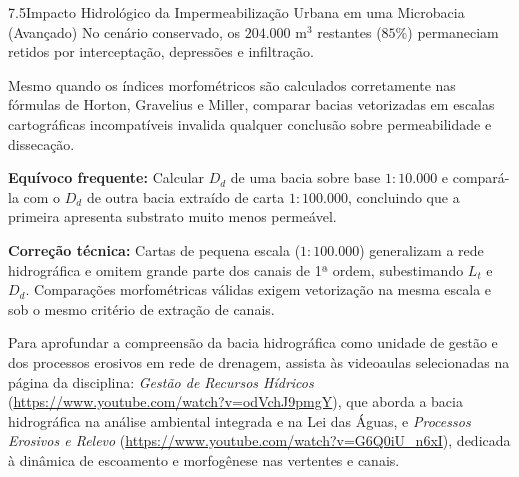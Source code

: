 \begin{boxExemplo}{7.5}{Impacto Hidrológico da Impermeabilização Urbana em uma Microbacia (Avançado)}
{  No cenário conservado, os $204.000\text{ m}^3$ restantes ($85\%$) permaneciam retidos por interceptação, depressões e infiltração.}
\end{boxExemplo}


Mesmo quando os índices morfométricos são calculados corretamente nas fórmulas de Horton, Gravelius e Miller, comparar bacias vetorizadas em escalas cartográficas incompatíveis invalida qualquer conclusão sobre permeabilidade e dissecação.

\begin{boxErro}
\textbf{Equívoco frequente:} Calcular $D_d$ de uma bacia sobre base $1{:}10.000$ e compará-la com o $D_d$ de outra bacia extraído de carta $1{:}100.000$, concluindo que a primeira apresenta substrato muito menos permeável.\par
\textbf{Correção técnica:} Cartas de pequena escala ($1{:}100.000$) generalizam a rede hidrográfica e omitem grande parte dos canais de 1ª ordem, subestimando $L_t$ e $D_d$. Comparações morfométricas válidas exigem vetorização na mesma escala e sob o mesmo critério de extração de canais.
\end{boxErro}

Para aprofundar a compreensão da bacia hidrográfica como unidade de gestão e dos processos erosivos em rede de drenagem, assista às videoaulas selecionadas na página da disciplina: \textit{Gestão de Recursos Hídricos} (\url{https://www.youtube.com/watch?v=odVchJ9pmgY}), que aborda a bacia hidrográfica na análise ambiental integrada e na Lei das Águas, e \textit{Processos Erosivos e Relevo} (\url{https://www.youtube.com/watch?v=G6Q0iU_n6xI}), dedicada à dinâmica de escoamento e morfogênese nas vertentes e canais.

